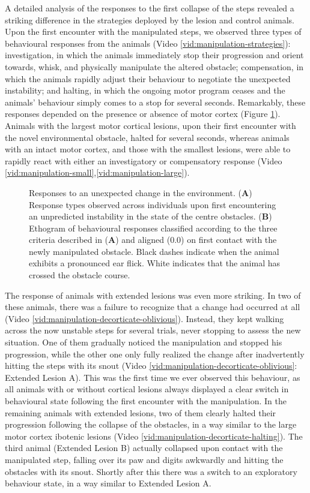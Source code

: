 A detailed analysis of the responses to the first collapse of the steps revealed a striking difference in the strategies deployed by the lesion and control animals. Upon the first encounter with the manipulated steps, we observed three types of behavioural responses from the animals (Video \ref{vid:manipulation-strategies}): investigation, in which the animals immediately stop their progression and orient towards, whisk, and physically manipulate the altered obstacle; compensation, in which the animals rapidly adjust their behaviour to negotiate the unexpected instability; and halting, in which the ongoing motor program ceases and the animals' behaviour simply comes to a stop for several seconds. Remarkably, these responses depended on the presence or absence of motor cortex (Figure \ref{fig:ethogram}). Animals with the largest motor cortical lesions, upon their first encounter with the novel environmental obstacle, halted for several seconds, whereas animals with an intact motor cortex, and those with the smallest lesions, were able to rapidly react with either an investigatory or compensatory response (Video \ref{vid:manipulation-small},\ref{vid:manipulation-large}).

\begin{figure}
\centering

\caption{Responses to an unexpected change in the environment. (\textbf{A}) Response types observed across individuals upon first encountering an unpredicted instability in the state of the centre obstacles. (\textbf{B}) Ethogram of behavioural responses classified according to the three criteria described in (\textbf{A}) and aligned (0.0) on first contact with the newly manipulated obstacle. Black dashes indicate when the animal exhibits a pronounced ear flick. White indicates that the animal has crossed the obstacle course.}
\label{fig:ethogram}
\end{figure}

The response of animals with extended lesions was even more striking. In two of these animals, there was a failure to recognize that a change had occurred at all (Video \ref{vid:manipulation-decorticate-oblivious}). Instead, they kept walking across the now unstable steps for several trials, never stopping to assess the new situation. One of them gradually noticed the manipulation and stopped his progression, while the other one only fully realized the change after inadvertently hitting the steps with its snout (Video \ref{vid:manipulation-decorticate-oblivious}: Extended Lesion A). This was the first time we ever observed this behaviour, as all animals with or without cortical lesions always displayed a clear switch in behavioural state following the first encounter with the manipulation. In the remaining animals with extended lesions, two of them clearly halted their progression following the collapse of the obstacles, in a way similar to the large motor cortex ibotenic lesions (Video \ref{vid:manipulation-decorticate-halting}). The third animal (Extended Lesion B) actually collapsed upon contact with the manipulated step, falling over its paw and digits awkwardly and hitting the obstacles with its snout. Shortly after this there was a switch to an exploratory behaviour state, in a way similar to Extended Lesion A.

